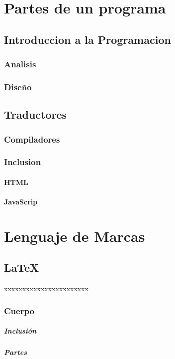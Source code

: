 \documentclass[10pt,a4paper]{book}
\begin{document}
\chapter{Partes de un programa}
	\section{Introduccion a la Programacion}
		\subsection{Analisis}
		\subsection{Diseño}
	\section{Traductores}
		\subsection{Compiladores}
		\subsection{Inclusion}
			\subsubsection{HTML}
		  	\subsubsection{JavaScrip}
\chapter{Lenguaje de Marcas}
	\section{LaTeX}
		xxxxxxxxxxxxxxxxxxxxxxx
		\subsection{Cuerpo}
			\paragraph{Inclusión}
			\paragraph{Partes}
\end{document}
